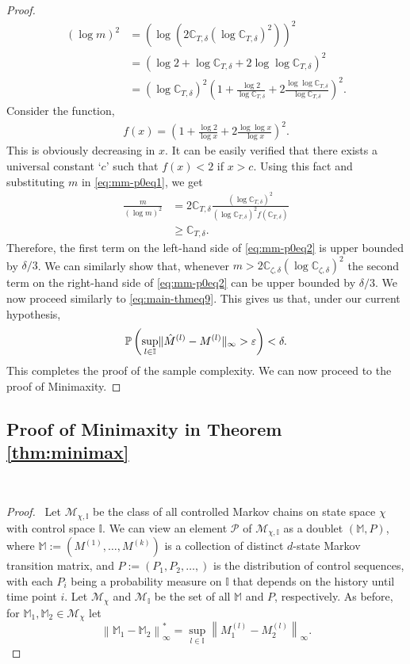 \documentclass[opre,sglanonrev]{informs4}
\numberwithin{equation}{section}
\newcommand{\pow}[1]{^{(#1)}}
\newcommand{\lp}{\left(}
\newcommand{\rp}{\right)}
\newcommand{\lV}{\left\|}
\newcommand{\rV}{\right\|}
\newcommand{\Cbb}{\mathbb{C}}
\newcommand{\Ibb}{\mathbb{I}}
\newcommand{\Mbb}{\mathbb{M}}
\newcommand{\Pbb}{\mathbb{P}}
\newcommand{\Mcal}{\mathcal{M}}
\newcommand{\Pcal}{\mathcal{P}}
\newcommand{\constant}{\Cbb}
\newcommand{\prob}{\Pbb}
\newcommand{\eps}{\varepsilon}
\renewcommand{\epsilon}{\eps}
\begin{document}
\begin{APPENDICES}
{\begin{proof}
\begin{align*}
    (\log m)^2 & =\lp\log \lp2\constant_{T,\delta}\lp\log\constant_{T,\delta}\rp^2\rp\rp^2\\
    & = \lp\log 2+\log\constant_{T,\delta}+2\log\log\constant_{T,\delta}\rp^2\\
    & = \lp\log \constant_{T,\delta}\rp^2\lp 1+\frac{\log 2}{\log \constant_{T,\delta}} + 2\frac{\log \log \constant_{T,\delta}}{\log \constant_{T,\delta}}\rp^2.
\end{align*}
Consider the function, 
\begin{align*}
    f(x) = \lp1+\frac{\log 2}{\log x}+2\frac{\log \log x}{\log x}\rp^2.
\end{align*}
This is obviously decreasing in $x$. It can be easily verified that there exists a universal constant `$c$' such that $f(x)<2$ if $x>c$. 
Using this fact and substituting $m$ in \cref{eq:mm-p0eq1}, we get
\begin{align*}
      \frac{m}{(\log m)^2} & = 2\constant_{T,\delta}\frac{\lp\log \constant_{T,\delta}\rp^2}{\lp\log \constant_{T,\delta}\rp^2 f(\constant_{T,\delta})}\\
      & \geq \constant_{T,\delta}.
\end{align*}
Therefore, the first term on the left-hand side of \cref{eq:mm-p0eq2} is upper bounded by $\delta/3$.
We can similarly show that, whenever $m>2\constant_{\zeta,\delta}\lp\log\constant_{\zeta,\delta}\rp^2$ the second term on the right-hand side of \cref{eq:mm-p0eq2} can be upper bounded by $\delta/3$.
We now proceed similarly to \cref{eq:main-thmeq9}. 
This gives us that, under our current hypothesis, 
\begin{align*}
    \prob\left(\underset{l\in \Ibb}{\sup} \|\Hat{M}^{(l)}-M^{(l)}\|_{\infty}>\epsilon  \right)< \delta.
\end{align*}
This completes the proof of the sample complexity. We can now proceed to the proof of Minimaxity.
\end{proof}
\subsection{Proof of Minimaxity in Theorem \ref{thm:minimax}}~\label{sec:proof-scmm}
\begin{proof} \ 
Let $\Mcal_{\chi,\Ibb}$ be the class of all controlled Markov chains on state space $\chi$ with control space $\Ibb$.
We can view an element $\Pcal$ of $\Mcal_{\chi,\Ibb}$ as a doublet $(\Mbb,P)$, where
$\Mbb:=(M\pow{1},\dots,M\pow{k})$ is a collection of distinct $d$-state Markov transition matrix, and $P:=\lp P_1,P_2,\dots, \rp$ is the distribution of control sequences, with each $P_i$ being a probability measure on $\Ibb$ that depends on the history until time point $i$.
Let $\Mcal_\chi$ and $\Mcal_\Ibb$ be the set of all $\Mbb$ and $P$, respectively. 
As before, for $\Mbb_1,\Mbb_2\in\Mcal_\chi$ let  
\[
\lV \Mbb_1-\Mbb_2 \rV_\infty^*=\sup_{l\in\Ibb}\lV M_1\pow{l}-M_2\pow{l}\rV_\infty.
\]


\end{proof}}
\end{APPENDICES}
\end{document}

